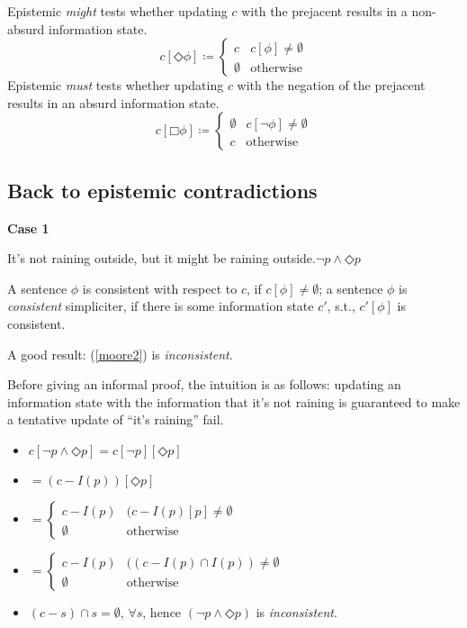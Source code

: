 \documentclass[nols,twoside,nofonts,nobib,nohyper]{tufte-handout}
\theoremstyle{definition}
\begin{document}
\begin{fullwidth}
\begin{tcbitemize}
  \tcbitem[title=Veltman's epistemic \textit{might}]
  Epistemic \textit{might} tests whether updating $c$ with the prejacent results in a non-absurd information state.
  \tcblower
  $$
  c[◇ ϕ] ≔ \begin{cases}
    c&c[ϕ] ≠ ∅\\
    \emptyset&\text{otherwise}
    \end{cases}
  $$
  \tcbitem[title=Epistemic \textit{must}]
  Epistemic \textit{must} tests whether updating $c$ with the negation of the prejacent results in an absurd information state.
  \tcblower
  $$
  c[□ ϕ] ≔ \begin{cases}
    ∅&c[¬ ϕ] ≠ ∅\\
    c&\text{otherwise}
    \end{cases}
  $$
\end{tcbitemize}

\end{fullwidth}

\subsection{Back to epistemic contradictions}

\textbf{Case 1}

\ex
It's not raining outside, but it might be raining outside.\hfill$¬ p ∧ ◇ p$\label{moore2}
\xe


\begin{tcolorbox}[title=Consistency in update semantics]
A sentence $ϕ$ is consistent with respect to $c$, if $c[ϕ] ≠ ∅$; a sentence $ϕ$ is \textit{consistent} simpliciter, if there is some information state $c'$, s.t., $c'[ϕ]$ is consistent.
\end{tcolorbox}

A good result: (\ref{moore2}) is \textit{inconsistent}.

Before giving an informal proof, the intuition is as follows: updating an information state with the information that it's not raining is guaranteed to make a tentative update of \enquote{it's raining} fail.

\begin{itemize}

    \item $c[¬ p ∧ ◇ p] = c[¬ p][◇ p]$
    \item $= (c - I(p))[◇ p]$
  \item $= \begin{cases}
    c - I(p)&(c - I(p)[p] ≠ ∅\\
    ∅&\text{otherwise}
    \end{cases}$
  \item $= \begin{cases}
    c - I(p)&((c - I(p) ∩ I(p)) ≠ ∅\\
    ∅&\text{otherwise}
    \end{cases}$
  \item $(c - s) ∩ s = ∅$, $∀s$, hence $(¬ p ∧ ◇ p)$ is \textit{inconsistent}.
\end{itemize}
\end{document}
